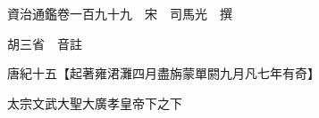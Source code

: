










 


 
 


 

  
  
  
  
  





  
  
  
  
  
 
  

  

  
  
  



  

 
 

  
   




  

  
  


  　　資治通鑑卷一百九十九　宋　司馬光　撰

　　胡三省　音註

　　唐紀十五【起著雍涒灘四月盡旃蒙單閼九月凡七年有奇】

　　太宗文武大聖大廣孝皇帝下之下

